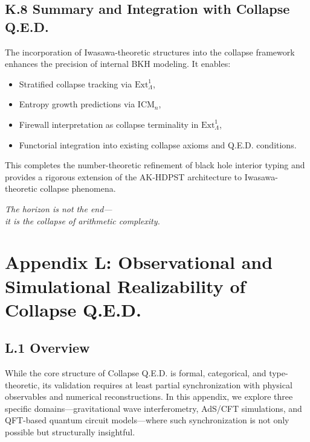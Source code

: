 \documentclass[11pt]{article}
\begin{document}
\subsection*{K.8 Summary and Integration with Collapse Q.E.D.}

The incorporation of Iwasawa-theoretic structures into the collapse framework enhances the precision of internal BKH modeling. It enables:

\begin{itemize}
  \item Stratified collapse tracking via \( \mathrm{Ext}^1_{\Lambda} \),
  \item Entropy growth predictions via \( \mathrm{ICM}_n \),
  \item Firewall interpretation as collapse terminality in \( \mathrm{Ext}^1_{\Lambda} \),
  \item Functorial integration into existing collapse axioms and Q.E.D. conditions.
\end{itemize}

This completes the number-theoretic refinement of black hole interior typing and provides a rigorous extension of the AK-HDPST architecture to Iwasawa-theoretic collapse phenomena.

\begin{center}
\textit{The horizon is not the end—} \\
\textit{it is the collapse of arithmetic complexity.}
\end{center}




\section*{Appendix L: Observational and Simulational Realizability of Collapse Q.E.D.}

\subsection*{L.1 Overview}

While the core structure of Collapse Q.E.D. is formal, categorical, and type-theoretic, its validation requires at least partial synchronization with physical observables and numerical reconstructions. In this appendix, we explore three specific domains—gravitational wave interferometry, AdS/CFT simulations, and QFT-based quantum circuit models—where such synchronization is not only possible but structurally insightful.
\end{document}
